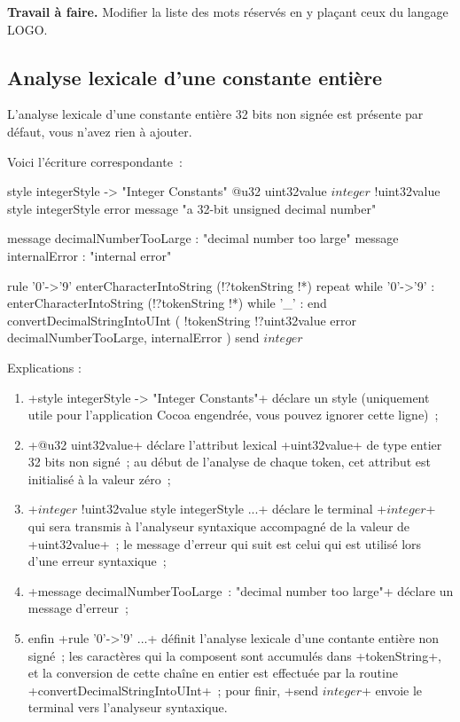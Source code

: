 \textbf{Travail à faire.} Modifier la liste des mots réservés en y plaçant ceux du langage LOGO.

\subsection{Analyse lexicale d'une constante entière}

L’analyse lexicale d’une constante entière 32 bits non signée est présente par défaut, vous n’avez rien à ajouter.

Voici l'écriture correspondante~:
\begin{galgas4}
style integerStyle -> "Integer Constants"
@u32 uint32value
$integer$ !uint32value style integerStyle
               error message "a 32-bit unsigned decimal number"

message decimalNumberTooLarge : "decimal number too large"
message internalError : "internal error"

rule '0'->'9' {
  enterCharacterIntoString (!?tokenString !*)
  repeat
  while '0'->'9' :
    enterCharacterIntoString (!?tokenString !*)
  while '_' :
  end
  convertDecimalStringIntoUInt (
    !tokenString
    !?uint32value
    error decimalNumberTooLarge, internalError
  )
  send $integer$
}
\end{galgas4}


Explications :
\begin{enumerate}
  \item \ggsq+style integerStyle -> "Integer Constants"+ déclare un style (uniquement utile pour l’application Cocoa engendrée, vous pouvez ignorer cette ligne)~;
  \item \ggsq+@u32 uint32value+ déclare l’attribut lexical \ggsq+uint32value+ de type entier 32 bits non signé~; au début de l’analyse de chaque token, cet attribut est initialisé à la valeur zéro~;
  \item \ggsq+$integer$ !uint32value style integerStyle ...+ déclare le terminal \ggsq+$integer$+ qui sera transmis à l’analyseur syntaxique accompagné de la valeur de \ggsq+uint32value+~;  le message d’erreur qui suit est celui qui est utilisé lors d’une erreur syntaxique~;
  \item \ggsq+message decimalNumberTooLarge~: "decimal number too large"+ déclare un message d’erreur~;
  \item enfin \ggsq+rule '0'->'9' ...+ définit l’analyse lexicale d’une contante entière non signé~; les caractères qui la composent sont accumulés dans \ggsq+tokenString+, et la conversion de cette chaîne en entier est effectuée par la routine \ggsq+convertDecimalStringIntoUInt+~; pour finir, \ggsq+send $integer$+ envoie le terminal vers l’analyseur syntaxique.
\end{enumerate}

